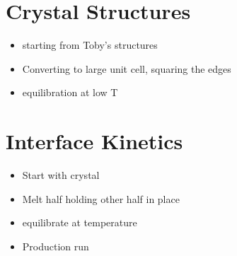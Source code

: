 \section{Crystal Structures}

\begin{itemize}
    \item starting from Toby's structures
    \item Converting to large unit cell, squaring the edges
    \item equilibration at low T
\end{itemize}

\section{Interface Kinetics}

\begin{itemize}
    \item Start with crystal
    \item Melt half holding other half in place
    \item equilibrate at temperature
    \item Production run
\end{itemize}


